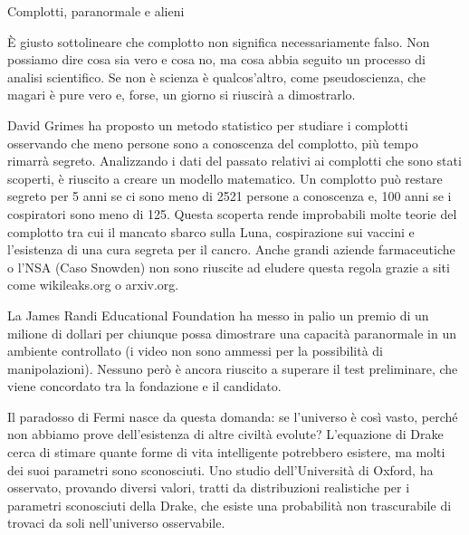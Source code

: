 \documentclass[12pt]{book} %
\begin{document}
\begin{mdframed}[linewidth=1pt]
Complotti, paranormale e alieni

È giusto sottolineare che complotto non significa necessariamente falso. 
Non possiamo dire cosa sia vero e cosa no, ma cosa abbia seguito un processo di analisi scientifico. 
Se non è scienza è qualcos'altro, come pseudoscienza, che magari è pure vero e, forse, un giorno si riuscirà a dimostrarlo.

David Grimes ha proposto un metodo statistico per studiare i complotti osservando che meno persone sono a conoscenza del complotto, più tempo rimarrà segreto.
Analizzando i dati del passato relativi ai complotti che sono stati scoperti, è riuscito a creare un modello matematico.
Un complotto può restare segreto per 5 anni se ci sono meno di 2521 persone a conoscenza e, 100 anni se i cospiratori sono meno di 125.
Questa scoperta rende improbabili molte teorie del complotto tra cui il mancato sbarco sulla Luna, cospirazione sui vaccini e l'esistenza di una cura segreta per il cancro.
Anche grandi aziende farmaceutiche o l'NSA (Caso Snowden) non sono riuscite ad eludere questa regola grazie a siti come wikileaks.org o arxiv.org.

La James Randi Educational Foundation ha messo in palio un premio di un milione di dollari per chiunque
possa dimostrare una capacità paranormale in un ambiente controllato (i video non sono ammessi per la possibilità di manipolazioni). 
Nessuno però è ancora riuscito a superare il test preliminare, che viene concordato tra la fondazione e il candidato.

Il paradosso di Fermi nasce da questa domanda: se l’universo è così vasto, perché non abbiamo prove dell’esistenza di altre civiltà evolute? L’equazione di Drake cerca di stimare quante forme di vita intelligente potrebbero esistere, ma molti dei suoi parametri sono sconosciuti. Uno studio dell’Università di Oxford, ha osservato, provando diversi valori, tratti da distribuzioni realistiche per i parametri sconosciuti della Drake, che esiste una probabilità non trascurabile di trovaci da soli nell’universo osservabile.


\end{mdframed}
\end{document}
